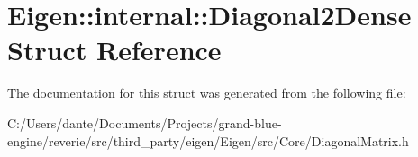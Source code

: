 \hypertarget{struct_eigen_1_1internal_1_1_diagonal2_dense}{}\section{Eigen\+::internal\+::Diagonal2\+Dense Struct Reference}
\label{struct_eigen_1_1internal_1_1_diagonal2_dense}


The documentation for this struct was generated from the following file\+:\begin{DoxyCompactItemize}
\item 
C\+:/\+Users/dante/\+Documents/\+Projects/grand-\/blue-\/engine/reverie/src/third\+\_\+party/eigen/\+Eigen/src/\+Core/Diagonal\+Matrix.\+h\end{DoxyCompactItemize}
